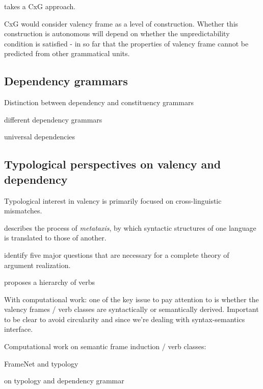 \citet{croft2012} takes a CxG approach. 

CxG would consider valency frame as a level of construction. Whether this construction is autonomous will depend on whether the unpredictability condition is satisfied - in so far that the properties of valency frame cannot be predicted from other grammatical units.


\subsection{Dependency grammars}

Distinction between dependency and constituency grammars \citep{stabler2019}

different dependency grammars \citet{demarneffe2019}

universal dependencies \citep{demarneffe2021}



\subsection{Typological perspectives on valency and dependency}

Typological interest in valency is primarily focused on cross-linguistic mismatches.

\citet{tesniere1959} describes the process of \textit{metataxis}, by which syntactic structures of one language is translated to those of another.  

\citet{levin2005} identify five major questions that are necessary for a complete theory of argument realization.


\citet{tsunoda1981, tsunoda1985} proposes a hierarchy of verbs

With computational work: one of the key issue to pay attention to is whether the valency frames / verb classes are syntactically or semantically derived. Important to be clear to avoid circularity and since we're dealing with syntax-semantics interface.

Computational work on semantic frame induction / verb classes:  \citet{abend2009, basili1993, bickel2014, dowty1991, fellbaum1998, fillmore1968, furstenau2012, kipper-schuler2005, kipper2008, korhonen2006, levin2015, majewska2018, majewska2020, majewska2021, miller1990, miller1995, navarretta2000, palmer2005, say2014, sayeed2018, schulteimwalde2002, schulteimwalde2003, schulteimwalde2006, snider2006, sun2008, sun2009, sun2013, titov2012, watanabe2010, yamada2021} 

\cite{baker2020, ellsworth2021} FrameNet and typology

\cite{croft2017} on typology and dependency grammar


